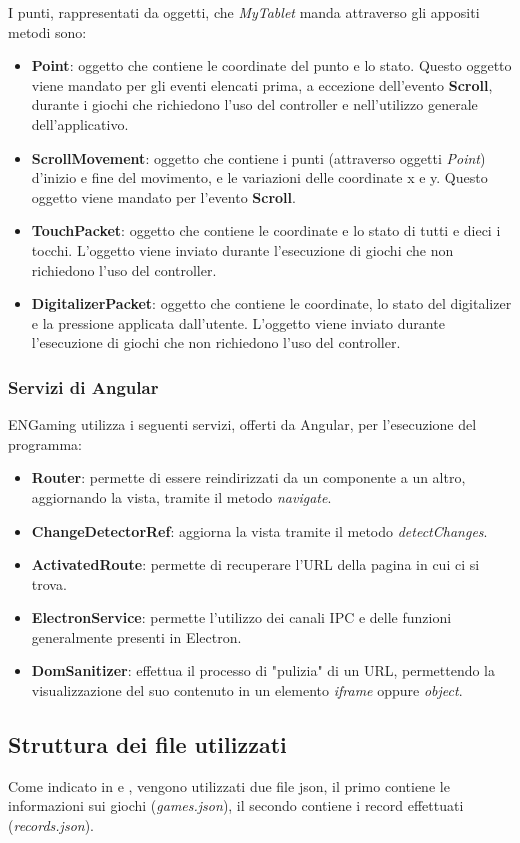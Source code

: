 I punti, rappresentati da oggetti, che \emph{MyTablet} manda attraverso gli appositi metodi sono:
\begin{itemize}
    \item \textbf{Point}: oggetto che contiene le coordinate del punto e lo stato. Questo oggetto viene mandato per gli eventi elencati prima, a eccezione dell'evento \textbf{Scroll}, durante i giochi che richiedono l'uso del controller e nell'utilizzo generale dell'applicativo.
    \item \textbf{ScrollMovement}: oggetto che contiene i punti (attraverso oggetti \emph{Point}) d'inizio e fine del movimento, e le variazioni delle coordinate x e y. Questo oggetto viene mandato per l'evento \textbf{Scroll}.
    \item \textbf{TouchPacket}: oggetto che contiene le coordinate e lo stato di tutti e dieci i tocchi. L'oggetto viene inviato durante l'esecuzione di giochi che non richiedono l'uso del controller.
    \item \textbf{DigitalizerPacket}: oggetto che contiene le coordinate, lo stato del digitalizer e la pressione applicata dall'utente. L'oggetto viene inviato durante l'esecuzione di giochi che non richiedono l'uso del controller.
\end{itemize}
\subsubsection{Servizi di Angular}
\label{subsec:angularServices}
ENGaming utilizza i seguenti servizi, offerti da Angular, per l'esecuzione del programma:
\begin{itemize}
    \item \textbf{Router}: permette di essere reindirizzati da un componente a un altro, aggiornando la vista, tramite il metodo \emph{navigate}.
    \item \textbf{ChangeDetectorRef}: aggiorna la vista tramite il metodo \emph{detectChanges}.
    \item \textbf{ActivatedRoute}: permette di recuperare l'URL della pagina in cui ci si trova.
    \item \textbf{ElectronService}: permette l'utilizzo dei canali IPC e delle funzioni generalmente presenti in Electron.
    \item \textbf{DomSanitizer}: effettua il processo di "pulizia" di un URL, permettendo la visualizzazione del suo contenuto in un elemento \emph{iframe} oppure \emph{object}.
\end{itemize}
\subsection{Struttura dei file utilizzati}
\label{subsec:strutturaFile}
Come indicato in  e , vengono utilizzati due file json, il primo contiene le informazioni sui giochi (\emph{games.json}), il secondo contiene i record effettuati (\emph{records.json}).
